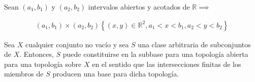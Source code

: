 \begin{ejemplo}
    Sean $(a_1,b_1)$ y $(a_2,b_2)$ intervalos abiertos y acotados de $\mathbb{R}\implies$

    \begin{align}
        (a_1,b_1)\times (a_2,b_2)\left\{(x,y)\in \mathbb{R}^2,a_1<x<b_1,a_2<y<b_2\right\}
    \end{align}
\end{ejemplo}

\begin{teorema}
    Sea $X$ cualquier conjunto no vacío y sea $S$ una clase arbitraria de subconjuntos de $X$. Entonces, $S$ puede constituirse en la subbase para una topología abierta para una topología sobre $X$ en el sentido que las intersecciones finitas de los miembros de $S$ producen una base para dicha topología. 
\end{teorema}

